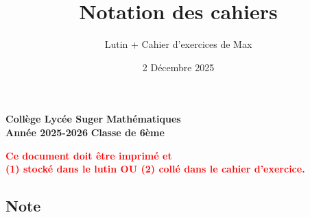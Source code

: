 \documentclass[answers]{exam}
\title{Notation des cahiers}
\author{Lutin + Cahier d'exercices de Max}
\date{2 Décembre 2025}
\begin{document}
\textbf{Collège Lycée Suger}
\hfill
\textbf{Mathématiques} \\

\textbf{Année 2025-2026}
\hfill
\textbf{Classe de 6ème} \par

{\let\newpage\relax\maketitle}

\begin{tcolorbox}[
  colframe=red!90!black,
  fonttitle=\bfseries,
  boxsep=4pt,
  sharp corners,
]
\begin{center}
\textbf{\textcolor{red}{Ce document doit être imprimé et \\ (1) stocké dans le lutin OU (2) collé dans le cahier d'exercice.}}
\end{center}
\end{tcolorbox}

\subsection*{Note}
\end{document}

